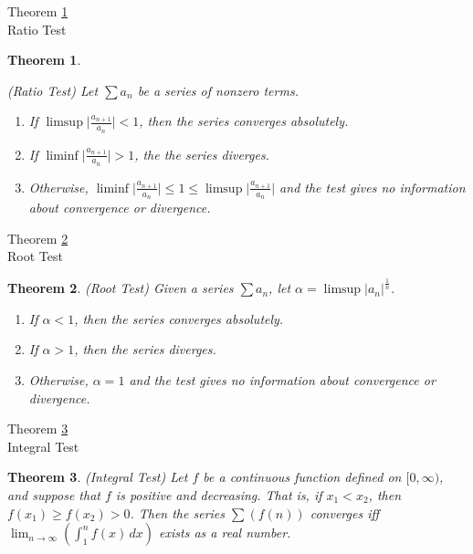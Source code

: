 \documentclass[avery5371,grid]{flashcards}
\newtheorem{theorem}{Theorem}
\begin{document}
\begin{flashcard}[Theorem]{Theorem \ref{thm109}\\ Ratio Test}
\begin{theorem}
\label{thm109}
\begin{small}
(Ratio Test)  Let $\displaystyle \sum a_n$ be a series of
nonzero terms.
\begin{enumerate}
\item  If $\displaystyle \limsup \Big| \frac{a_{n+1}}{a_n} \Big| < 1$,
then the series converges absolutely.
\item  If $\displaystyle \liminf \Big| \frac{a_{n+1}}{a_n} \Big| > 1$,
the the series diverges.
\item  Otherwise, $\displaystyle \liminf \Big| \frac{a_{n+1}}{a_n} \Big|
\leq 1 \leq \limsup \Big| \frac{a_{n+1}}{a_n} \Big|$ and the test gives
no information about convergence or divergence.
\end{enumerate}
\end{small}
\end{theorem}
\end{flashcard}

\begin{flashcard}[Theorem]{Theorem \ref{thm110}\\ Root Test}
\begin{theorem}
\label{thm110}
(Root Test)  Given a series $\displaystyle \sum a_n$, let
$\alpha = \limsup |a_n|^{\frac 1n}$.
\begin{enumerate}
\item  If $\alpha < 1$, then the series converges absolutely.
\item  If $\alpha > 1$, then the series diverges.
\item  Otherwise, $\alpha = 1$ and the test gives no information about
convergence or divergence.
\end{enumerate}
\end{theorem}
\end{flashcard}

\begin{flashcard}[Theorem]{Theorem \ref{thm111}\\
Integral Test}
\begin{theorem}
\label{thm111}
(Integral Test)  Let $f$ be a continuous function defined on
$[0, \infty)$, and suppose that $f$ is positive and decreasing.  That is,
if $x_1 < x_2$, then $f(x_1) \geq f(x_2) > 0$.  Then the series
$\displaystyle \sum (f(n))$ converges iff $\displaystyle
\lim _{n \to \infty} \left( \int _1 ^n f(x) \, dx \right)$ exists
as a real number.
\end{theorem}
\end{flashcard}
\end{document}
